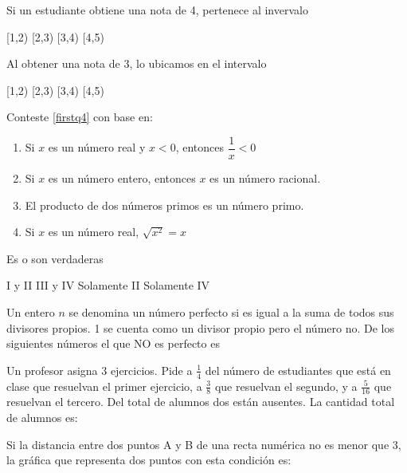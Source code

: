 \documentclass[10pt,letterpaper,addpoints]{exam}
\begin{document}
\begin{multicols}{2}
\begin{questions}
\begin{oneparchoices}
\end{oneparchoices}
\question Si un estudiante obtiene una nota de 4, pertenece al invervalo

\begin{oneparchoices}
 \choice [1,2) 
 \choice [2,3)
 \choice [3,4)
 \CorrectChoice [4,5)
\end{oneparchoices}
\question \label{lastq2} Al obtener una nota de 3, lo ubicamos en el intervalo

\begin{oneparchoices}
 \choice [1,2)
 \choice [2,3)
 \CorrectChoice [3,4)
 \choice [4,5)
\end{oneparchoices}
\begin{uplevel}{Conteste \ref{firstq4} con base en:
\begin{enumerate}
 \item[I] Si $x$ es un número real y $x<0$, entonces $\dfrac{1}{x}<0$
 \item[II] Si $x$ es un número entero, entonces $x$ es un número racional.
 \item[III] El producto de dos números primos es un número primo.
 \item[IV] Si $x$ es un número real, $\sqrt{x^{2}}=x$
\end{enumerate}
 }
\end{uplevel}
\question \label{firstq4} Es o son verdaderas

\begin{choices}
 \CorrectChoice I y II
 \choice III y IV
 \choice Solamente II
 \choice Solamente IV
\end{choices}
\question Un entero $n$ se denomina un número perfecto si es igual a la suma de todos sus divisores propios. 1 se cuenta como un divisor propio pero el número no. De los siguientes números el que NO es perfecto es

\begin{oneparchoices}
\end{oneparchoices}
\question Un profesor asigna 3 ejercicios. Pide a $\frac{1}{4}$ del número de estudiantes que está en clase que resuelvan el primer ejercicio, a $\frac{3}{8}$ que resuelvan el segundo, y a $\frac{5}{16}$ que resuelvan el tercero. Del total de alumnos dos están ausentes. La cantidad total de alumnos es:

\begin{oneparchoices}
\end{oneparchoices}
\question Si la distancia entre dos puntos A y B de una recta numérica no es menor que 3, la gráfica que representa dos puntos con esta condición es:


\end{questions}
\end{multicols}
\end{document}
